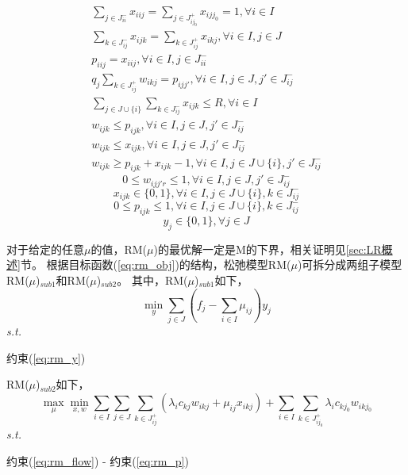 \begin{gather}
\sum_{j\in J_{ii}^-}x_{iij} = \sum_{j\in J_{i{j_{0}}}^+} x_{ijj_0} = 1, \forall i \in I  \label{eq:rm_flow}\\
\sum_{k\in J_{ij}^-} x_{ijk} = \sum_{k\in J_{ij}^+} x_{ikj}, \forall i \in I, j \in J    \\
p_{iij} = x_{iij}, \forall i\in I, j\in J_{ii}^- \\
q_j\sum_{k\in J_{ij}^+} w_{ikj}= p_{ijj'}, \forall i \in I, j \in J, j'\in J_{ij}^- \\
\sum_{j\in J\cup\{i\}} \sum_{k\in J_{ij}^-} x_{ijk} \le R, \forall i\in I \\
w_{ijk} \le p_{ijk}, \forall i \in I, j \in J, j'\in J_{ij}^- \\
w_{ijk} \le x_{ijk}, \forall i \in I, j \in J, j'\in J_{ij}^- \\
w_{ijk} \ge p_{ijk} + x_{ijk} - 1, \forall i \in I, j \in J \cup \{i\}, j'\in J_{ij}^-
\end{gather}
\begin{equation}
0 \le w_{ijj'r} \le 1, \forall i \in I, j \in J, j'\in J_{ij}^- 
\end{equation}
\begin{equation}
x_{ijk} \in \{0,1\}, \forall i \in I, j \in J\cup \{i\}, k\in J_{ij}^-
\end{equation}
\begin{equation}
0 \le p_{ijk} \le 1, \forall i \in I, j \in J\cup \{i\}, k\in J_{ij}^- \label{eq:rm_p}
\end{equation}
\begin{equation}
y_{j} \in\{0,1\}, \forall j \in {J} \label{eq:rm_y}
\end{equation}

对于给定的任意$\mu$的值，RM($\mu$)的最优解一定是M的下界，相关证明见\ref{sec:LR概述}节。
根据目标函数(\ref{eq:rm_obj})的结构，松弛模型RM($\mu$)可拆分成两组子模型RM($\mu$)$_{sub1}$和RM($\mu$)$_{sub2}$。
其中，RM($\mu$)$_{sub1}$如下，
\begin{equation}
\min_{y} \sum_{j\in J} (f_j  - \sum_{i\in I}\mu_{ij}) y_j
\end{equation}
\textit{s.t.}
\begin{center}
   约束(\ref{eq:rm_y})
\end{center}
RM($\mu$)$_{sub2}$如下，
\begin{equation}
\max_{\mu}\min_{x,w} 
\sum_{i\in I} \sum_{j\in J} \sum_{k\in J_{ij}^+} (\lambda_i c_{kj} w_{ikj} + \mu_{ij} x_{ikj}) 
+ \sum_{i\in I} \sum_{k\in J_{ij_0}^+}\lambda_i c_{kj_0} w_{ikj_0}
\label{eq:rm2_obj}
\end{equation}
\textit{s.t.}
\begin{center}
   约束(\ref{eq:rm_flow}) - 约束(\ref{eq:rm_p})
\end{center}

